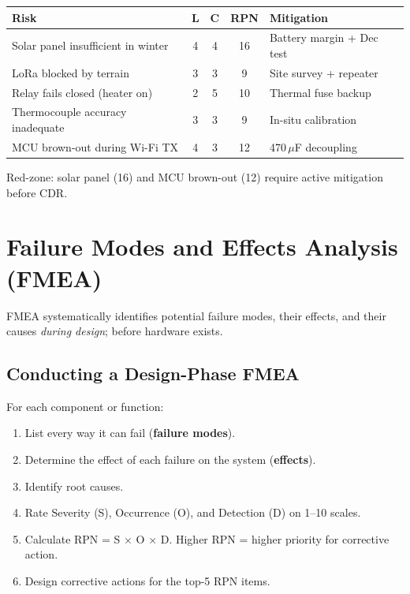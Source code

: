 \documentclass[11pt,letterpaper,twoside,openany]{book}
\begin{document}
\begin{greenshieldbox}
\small
\begin{tabularx}{\textwidth}{X c c c X}
\toprule
\textbf{Risk} & \textbf{L} & \textbf{C} & \textbf{RPN} & \textbf{Mitigation} \\
\midrule
Solar panel insufficient in winter & 4 & 4 & 16 & Battery margin + Dec test \\
LoRa blocked by terrain & 3 & 3 & 9 & Site survey + repeater \\
Relay fails closed (heater on) & 2 & 5 & 10 & Thermal fuse backup \\
Thermocouple accuracy inadequate & 3 & 3 & 9 & In-situ calibration \\
MCU brown-out\index{brown-out} during Wi-Fi TX & 4 & 3 & 12 & 470\,$\mu$F decoupling \\
\bottomrule
\end{tabularx}
Red-zone: solar panel (16) and MCU brown-out (12) require active mitigation before CDR.
\end{greenshieldbox}

\section{Failure Modes and Effects Analysis (FMEA)}
FMEA systematically identifies potential failure modes, their effects, and their causes \emph{during design}; before hardware exists.

\subsection{Conducting a Design-Phase FMEA}
For each component or function:
\begin{enumerate}[nosep,leftmargin=1.5em]
\item List every way it can fail (\textbf{failure modes}).
\item Determine the effect of each failure on the system (\textbf{effects}).
\item Identify root causes.
\item Rate Severity (S), Occurrence (O), and Detection (D) on 1--10 scales.
\item Calculate RPN = S $\times$ O $\times$ D. Higher RPN = higher priority for corrective action.
\item Design corrective actions for the top-5 RPN items.
\end{enumerate}
\end{document}
